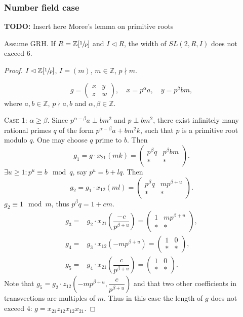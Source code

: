 \subsubsection{Number field case}
\textbf{TODO:} Insert here Moree's lemma on primitive roots
\begin{lemma}\label{lemma:Z1p}
Assume GRH. If $R=\mathbb{Z}[\sfrac{1}{p}]$ and $I\lhd R$, the width of $SL(2,R,I)$ does not exceed $6$.
\end{lemma}
\begin{proof}
$I\lhd\mathbb{Z}[\sfrac{1}{p}]$, $I=(m)$, $m\in\mathbb{Z}$, $p\nmid m$.

\[ g=\begin{pmatrix}
x & y \\ z & w
\end{pmatrix},\quad x =p^\alpha a,\quad y =p^\beta bm, \]
where $a,b\in\mathbb{Z}$, $p\nmid a,b$ and $\alpha,\beta\in\mathbb{Z}$.

\textsc{Case 1:} $\alpha\geqslant\beta$. Since $p^{\alpha-\beta}a\perp bm^2$ and $p\perp bm^2$, there exist infinitely many rational primes $q$ of the form $p^{\alpha-\beta}a+bm^2k$, such that $p$ is a primitive root modulo $q$. One may choose $q$ prime to $b$. Then
\[ g_1=g\cdot x_{21}(mk) =
\begin{pmatrix} p^\beta q & p^\beta bm \\ * & * \end{pmatrix}.\]
$\exists u\geqslant 1: p^u\equiv b\mod q$, say $p^u=b+lq$. Then
\[ g_2 = g_1\cdot x_{12}(ml) =
\begin{pmatrix} p^\beta q & mp^{\beta+u} \\ * & * \end{pmatrix}. \]
$g_2\equiv 1\mod m$, thus $p^\beta q=1+cm$.
\begin{align*}
g_3 = & g_2\cdot x_{21}\left(\dfrac{-c}{p^{\beta+u}}\right) =
\begin{pmatrix} 1 & mp^{\beta+u} \\ * & * \end{pmatrix}, \\
g_4 = & g_3\cdot x_{12}(-mp^{\beta+u}) =
\begin{pmatrix} 1 & 0 \\ * & * \end{pmatrix}, \\
g_5 = & g_4\cdot x_{21}\left(\dfrac{c}{p^{\beta+u}}\right) =
\begin{pmatrix} 1 & 0 \\ * & * \end{pmatrix}.
\end{align*}
Note that $g_5=g_2\cdot z_{12}\left(-mp^{\beta+u},\dfrac{c}{p^{\beta+u}}\right)$ and that two other coefficients in transvections are multiples of $m$. Thus in this case the length of $g$ does not exceed $4$: $g=x_{21}z_{12}x_{12}x_{21}$.


\end{proof}
